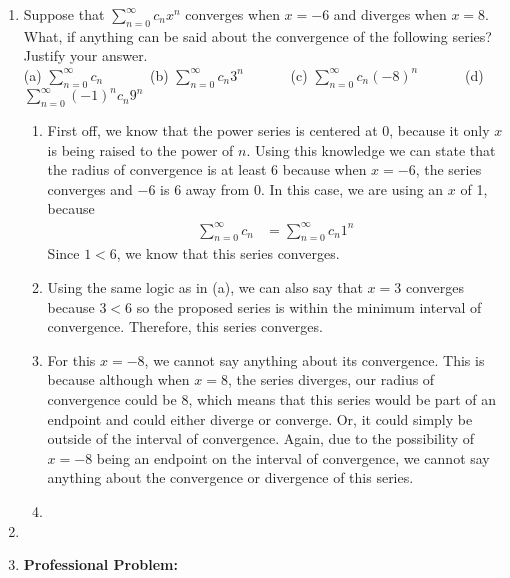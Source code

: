 \documentclass{article}
\begin{document}
\begin{enumerate}[label=\textbf{(13.\arabic*)}]

\newpage

\item Suppose that $\displaystyle \sum_{n=0}^\infty c_n x^n$ converges when $x=-6$ and diverges when $x=8$. What, if anything can be said about the convergence of the following series? Justify your answer.\\
(a) $\displaystyle \sum_{n=0}^\infty c_n\quad\quad\quad$ (b) $\displaystyle \sum_{n=0}^\infty c_n3^n\quad\quad\quad$ (c) $\displaystyle \sum_{n=0}^\infty c_n(-8)^n\quad\quad\quad$ (d) $\displaystyle \sum_{n=0}^\infty (-1)^nc_n9^n$

\begin{enumerate}
\item First off, we know that the power series is centered at 0, because it only $x$ is being raised to the power of $n$. Using this knowledge we can state that the radius of convergence is at least 6 because when $x=-6$, the series converges and $-6$ is 6 away from 0. In this case, we are using an $x$ of 1, because
\begin{align*}
\sum_{n=0}^\infty c_n &= \sum_{n=0}^\infty c_n1^n
\end{align*}
Since $1<6$, we know that this series converges.
\item Using the same logic as in (a), we can also say that $x=3$ converges because $3<6$ so the proposed series is within the minimum interval of convergence. Therefore, this series converges.
\item For this $x=-8$, we cannot say anything about its convergence. This is because although when $x=8$, the series diverges, our radius of convergence could be 8, which means that this series would be part of an endpoint and could either diverge or converge. Or, it could simply be outside of the interval of convergence. Again, due to the possibility of $x=-8$ being an endpoint on the interval of convergence, we cannot say anything about the convergence or divergence of this series. 
\item 					
\end{enumerate}

\newpage

\item


\newpage


\item \textbf{Professional Problem:}
\end{enumerate}
\end{document}
